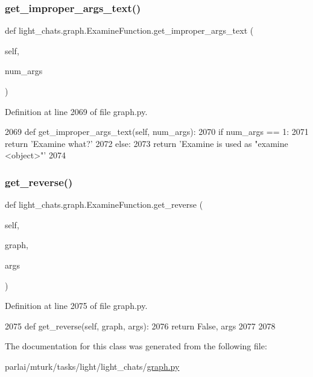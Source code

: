 \subsubsection{\texorpdfstring{get\+\_\+improper\+\_\+args\+\_\+text()}{get\_improper\_args\_text()}}
{\footnotesize\ttfamily def light\+\_\+chats.\+graph.\+Examine\+Function.\+get\+\_\+improper\+\_\+args\+\_\+text (\begin{DoxyParamCaption}\item[{}]{self,  }\item[{}]{num\+\_\+args }\end{DoxyParamCaption})}



Definition at line 2069 of file graph.\+py.


\begin{DoxyCode}
2069     \textcolor{keyword}{def }get\_improper\_args\_text(self, num\_args):
2070         \textcolor{keywordflow}{if} num\_args == 1:
2071             \textcolor{keywordflow}{return} \textcolor{stringliteral}{'Examine what?'}
2072         \textcolor{keywordflow}{else}:
2073             \textcolor{keywordflow}{return} \textcolor{stringliteral}{'Examine is used as "examine <object>"'}
2074 
\end{DoxyCode}
\mbox{\label{classlight__chats_1_1graph_1_1ExamineFunction_ab489f99594157bdf84e8c67e7f9504bc}} 
\subsubsection{\texorpdfstring{get\+\_\+reverse()}{get\_reverse()}}
{\footnotesize\ttfamily def light\+\_\+chats.\+graph.\+Examine\+Function.\+get\+\_\+reverse (\begin{DoxyParamCaption}\item[{}]{self,  }\item[{}]{graph,  }\item[{}]{args }\end{DoxyParamCaption})}



Definition at line 2075 of file graph.\+py.


\begin{DoxyCode}
2075     \textcolor{keyword}{def }get\_reverse(self, graph, args):
2076         \textcolor{keywordflow}{return} \textcolor{keyword}{False}, args
2077 
2078 
\end{DoxyCode}


The documentation for this class was generated from the following file\+:\begin{DoxyCompactItemize}
\item 
parlai/mturk/tasks/light/light\+\_\+chats/\hyperlink{parlai_2mturk_2tasks_2light_2light__chats_2graph_8py}{graph.\+py}\end{DoxyCompactItemize}
